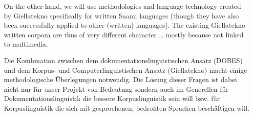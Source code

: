 \documentclass[a4paper,12pt]{article}
\begin{document}
On the other hand, we will use methodologies and language technology created by Giellatekno specifically for written Saami languages (though they have also been successfully applied to other (written) languages). The existing Giellatekno written corpora are thus of very different character … mostly because not linked to multimedia.

Die Kombination zwischen dem dokumentationslinguistischen Ansatz (DOBES) und dem Korpus- und Computerlinguistischen Ansatz (Giellatekno) macht einige methodologische Überlegungen notwendig. Die Lösung dieser Fragen ist dabei nicht nur für unser Projekt von Bedeutung sondern auch im Generellen für Dokumentationslinguistik die bessere Korpuslinguistik sein will bzw. für Korpuslinguistik die sich mit gesprochenen, bedrohten Sprachen beschäftigen will.


\end{document}
